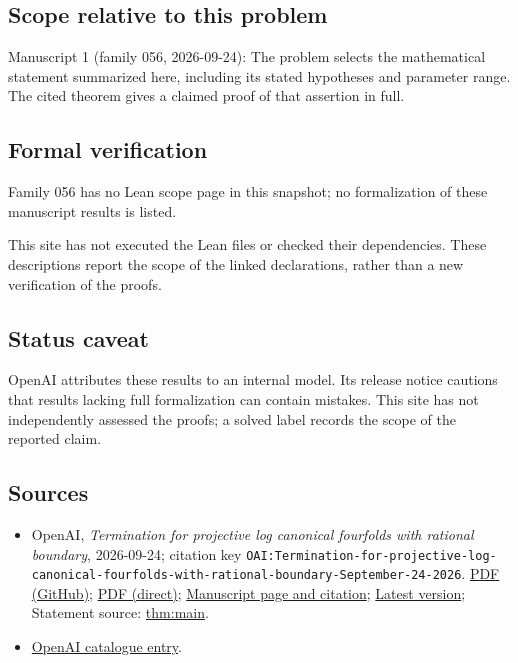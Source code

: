 \documentclass[11pt]{article}
\begin{document}
\subsection{Scope relative to this problem}
Manuscript 1 (family 056, 2026-09-24): The problem selects the mathematical statement summarized here, including its stated hypotheses and parameter range. The cited theorem gives a claimed proof of that assertion in full.

\subsection{Formal verification}
Family 056 has no Lean scope page in this snapshot; no formalization of these manuscript results is listed.

This site has not executed the Lean files or checked their dependencies. These descriptions report the scope of the linked declarations, rather than a new verification of the proofs.

\subsection{Status caveat}
OpenAI attributes these results to an internal model. Its release notice cautions that results lacking full formalization can contain mistakes. This site has not independently assessed the proofs; a solved label records the scope of the reported claim.

\subsection{Sources}
\begin{itemize}
\item OpenAI, \emph{Termination for projective log canonical fourfolds with rational boundary}, 2026-09-24; citation key \texttt{OAI:Termination-for-projective-log-canonical-fourfolds-with-rational-boundary-September-24-2026}. \href{https://github.com/openai/math/blob/adc7f1241b42e322a6451854ab7e4b4c146bf78a/preprints/Termination-for-projective-log-canonical-fourfolds-with-rational-boundary-September-24-2026/paper.pdf}{PDF (GitHub)}; \href{https://github.com/openai/math/raw/adc7f1241b42e322a6451854ab7e4b4c146bf78a/preprints/Termination-for-projective-log-canonical-fourfolds-with-rational-boundary-September-24-2026/paper.pdf}{PDF (direct)}; \href{https://github.com/openai/math/blob/adc7f1241b42e322a6451854ab7e4b4c146bf78a/preprints/Termination-for-projective-log-canonical-fourfolds-with-rational-boundary-September-24-2026/README.md}{Manuscript page and citation}; \href{https://github.com/openai/math/blob/main/preprints/Termination-for-projective-log-canonical-fourfolds-with-rational-boundary-September-24-2026/paper.pdf}{Latest version}; Statement source: \href{https://github.com/openai/math/blob/adc7f1241b42e322a6451854ab7e4b4c146bf78a/preprints/Termination-for-projective-log-canonical-fourfolds-with-rational-boundary-September-24-2026/build/sections/00-introduction.tex\#L97}{thm:main}.
\item \href{https://github.com/openai/math/blob/adc7f1241b42e322a6451854ab7e4b4c146bf78a/CONTENTS.md}{OpenAI catalogue entry}.
\end{itemize}
\end{document}
